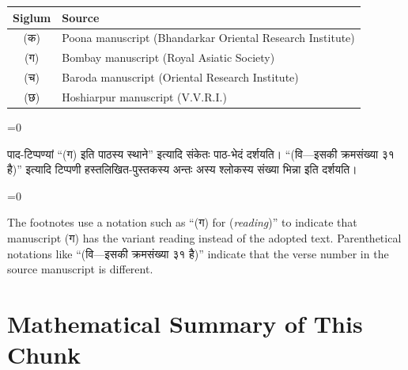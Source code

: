 \documentclass[11pt,a4paper]{article}
\newcommand{\dev}[1]{{\devanagarifont\color{sktcolor}#1}}
\newenvironment{paracol}[1]{\begingroup}{\endgroup}
\newcommand{\switchcolumn}[1][]{%
  \ifnum#1=0\relax\else\par\nobreak\vspace{0.5em}\par\nobreak\fi%
}
\begin{document}
\begin{center}
\begin{tabular}{@{}cl@{}}
\toprule
\textbf{Siglum} & \textbf{Source} \\
\midrule
(क) & Poona manuscript (Bhandarkar Oriental Research Institute) \\
(ग) & Bombay manuscript (Royal Asiatic Society) \\
(च) & Baroda manuscript (Oriental Research Institute) \\
(छ) & Hoshiarpur manuscript (V.V.R.I.) \\
\bottomrule
\end{tabular}
\end{center}

\vspace{0.3cm}

\begin{paracol}{2}
\switchcolumn[0]
\dev{%
पाद-टिप्पण्यां ``(ग) इति पाठस्य स्थाने'' इत्यादि
संकेतः पाठ-भेदं दर्शयति। ``(वि—इसकी क्रमसंख्या ३१ है)''
इत्यादि टिप्पणी हस्तलिखित-पुस्तकस्य अन्तः अस्य श्लोकस्य
संख्या भिन्ना इति दर्शयति।
}

\switchcolumn[1]
The footnotes use a notation such as ``(ग) for (\textit{reading})''
to indicate that manuscript (ग) has the variant reading instead of
the adopted text. Parenthetical notations like ``(वि—इसकी क्रमसंख्या
३१ है)'' indicate that the verse number in the source manuscript is
different.
\end{paracol}

\vspace{0.5cm}

\section*{Mathematical Summary of This Chunk}
\end{document}

